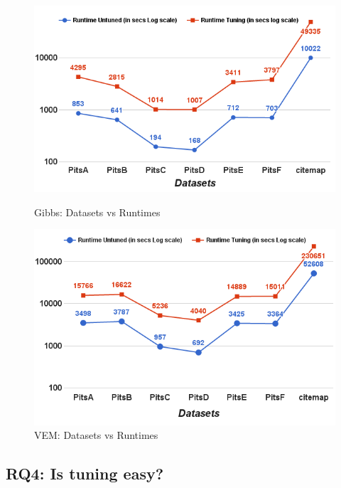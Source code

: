 \documentclass[10pt,conference]{IEEEtran}
\theoremstyle{break}
\begin{document}
\begin{figure}[!t]
    \centering
    \begin{minipage}{.5\textwidth}
        \captionsetup{justification=centering,singlelinecheck=off}
        \includegraphics[width=\linewidth]{./fig/Run_gibbs_sci.png}
  \caption{Gibbs: Datasets vs Runtimes}
  \label{RQ5 Gibbs}
    \end{minipage}%
    \begin{minipage}{.5\textwidth}
        \captionsetup{labelsep=space,justification=centering,singlelinecheck=off}
        \includegraphics[width=\linewidth]{./fig/Run_VEM_sci.png}
  \caption{VEM: Datasets vs Runtimes}
  \label{RQ5 VEM}
    \end{minipage}
\end{figure}

\subsection{\textbf{RQ4: Is  tuning  easy?}}
\end{document}
